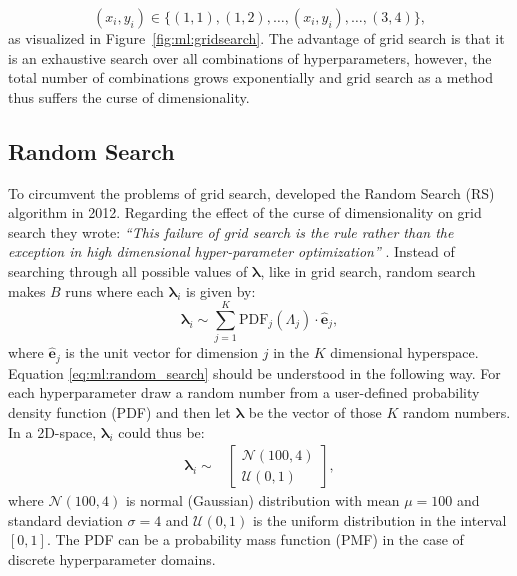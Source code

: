 \begin{equation}
  (x_i, y_i) \in \{(1, 1), (1, 2), \dots, (x_i, y_i), \dots, (3, 4)\},
\end{equation}
as visualized in Figure~\ref{fig:ml:gridsearch}. The advantage of grid search is that it is an exhaustive search over all combinations of hyperparameters, however, the total number of combinations grows exponentially and grid search as a method thus suffers the curse of dimensionality.



\subsection{Random Search}
\label{subsec:ml:random_search}

To circumvent the problems of grid search, \citet{bergstraRandomSearchHyperparameter2012} developed the Random Search (RS) algorithm in 2012. Regarding the effect of the curse of dimensionality on grid search they wrote: \emph{``This failure of grid search is the rule rather than the exception in high dimensional hyper-parameter optimization''} \citep{bergstraRandomSearchHyperparameter2012}. Instead of searching through all possible values of $\bm{\lambda}$, like in grid search, random search makes $B$ runs where each $\bm{\lambda}_i$ is given by:
\begin{equation}
  \label{eq:ml:random_search}
  \bm{\lambda}_i \sim \sum_{j=1}^K  \mathrm{PDF}_j(\Lambda_j) \cdot \bm{\hat{e}}_j ,
\end{equation}
where $\bm{\hat{e}}_j$ is the unit vector for dimension $j$ in the $K$ dimensional hyperspace. Equation \eqref{eq:ml:random_search} should be understood in the following way. For each hyperparameter draw a random number from a user-defined probability density function (PDF) and then let $\bm{\lambda}$ be the vector of those $K$ random numbers. In a 2D-space, $\bm{\lambda}_i$ could thus be: 
\begin{align}
  \bm{\lambda}_i \sim & \begin{bmatrix}
      \mathcal{N}(100, 4) \\
      \mathcal{U}(0, 1)
       \end{bmatrix},
\end{align}
where $\mathcal{N}(100, 4)$ is normal (Gaussian) distribution with mean $\mu=100$ and standard deviation $\sigma=4$ and $\mathcal{U}(0, 1)$ is the uniform distribution in the interval $[0, 1]$. The PDF can be a probability mass function (PMF) in the case of discrete hyperparameter domains.


